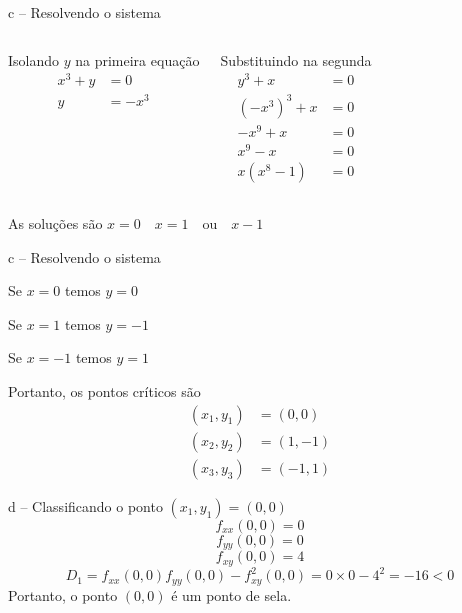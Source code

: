 \begin{resolution}{c -- Resolvendo o sistema}
\begin{columns}[t]
  Isolando $y$ na primeira equação
  \begin{align*}
    x^3 + y & = 0 \\
    y       & = -x^3
  \end{align*}

  Substituindo na segunda
  \begin{align*}
    y^3 + x                 & = 0 \\
    \left(-x^3\right)^3 + x & = 0 \\
    -x^9 + x                & = 0 \\
    x^9 - x                 & = 0 \\
    x(x^8 - 1)              & = 0
  \end{align*}
\end{columns}

  \bigskip
  As soluções são
  \(
    x=0
    \quad
    x=1
    \quad\text{ou}\quad
    x-1
  \)
\end{resolution}

\begin{resolution}{c -- Resolvendo o sistema}

  Se $x=0$ temos $y=0$

  Se $x=1$ temos $y=-1$

  Se $x=-1$ temos $y=1$

  Portanto, os pontos críticos são
  \begin{align*}
    (x_1, y_1) & = ( 0,  0) \\
    (x_2, y_2) & = ( 1, -1) \\
    (x_3, y_3) & = (-1,  1)
  \end{align*}
\end{resolution}

\begin{resolution}{d -- Classificando o ponto \((x_1, y_1) = (0, 0)\)}
  \[
  f_{xx}(0, 0) = 0
  \]
  \[
  f_{yy}(0, 0) = 0
  \]
  \[
  f_{xy}(0, 0) = 4
  \]
  \[
  D_1
  = f_{xx}(0, 0)f_{yy}(0, 0) - f^2_{xy}(0, 0)
  = 0 \times 0 - 4^2
  = -16 < 0
  \]
  Portanto, o ponto $(0, 0)$ é um ponto de sela.
\end{resolution}


